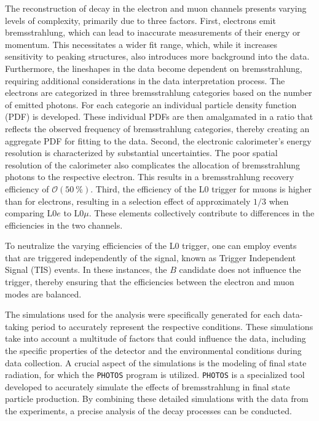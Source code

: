 The reconstruction of decay in the electron and muon channels presents varying levels of 
complexity, primarily due to three factors. First, electrons emit bremsstrahlung, which 
can lead to inaccurate measurements of their energy or momentum. This necessitates a wider 
fit range, which, while it increases sensitivity to peaking structures, also 
introduces more background into the data. Furthermore, the lineshapes in the data become 
dependent on bremsstrahlung, requiring additional considerations in the data interpretation 
process. The electrons are categorized in three bremsstrahlung categories based on the 
number of emitted photons. For each categorie an individual particle density function (PDF) 
is developed. These individual PDFs are then amalgamated in a ratio that reflects the observed 
frequency of bremsstrahlung categories, thereby creating an aggregate PDF for fitting to the 
data.
Second, the electronic calorimeter's energy resolution is characterized 
by substantial uncertainties. The poor spatial resolution of the calorimeter also complicates 
the allocation of bremsstrahlung photons to the respective electron. This results in a 
bremsstrahlung recovery efficiency of $\mathcal{O}(\SI{50}{\%})$.
Third, the efficiency of the L0 trigger for muons is higher than for electrons, resulting 
in a selection effect of approximately $1/3$ when comparing $\text{L0}e$ to $\text{L0}\mu$.
These elements collectively contribute to differences in the efficiencies in the two channels. 

To neutralize the varying efficiencies of the L0 trigger, one can employ events that are 
triggered independently of the signal, known as Trigger Independent Signal (TIS) events. 
In these instances, the $B$ candidate does not influence the trigger, thereby ensuring that 
the efficiencies between the electron and muon modes are balanced.

The simulations used for the analysis were specifically generated for each data-taking period 
to accurately represent the respective conditions. These simulations take into account a multitude 
of factors that could influence the data, including the specific properties of the detector and 
the environmental conditions during data collection. A crucial aspect of the simulations is the 
modeling of final state radiation, for which the \texttt{PHOTOS} \cite{PHOTOS} program is utilized. 
\texttt{PHOTOS} is a specialized tool developed to accurately simulate the effects of bremsstrahlung in 
final state particle production. By combining these detailed simulations with the data from the 
experiments, a precise analysis of the decay processes can be conducted.

